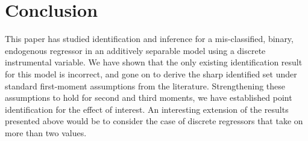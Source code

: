 \section{Conclusion}
\label{sec:conclusion}

This paper has studied identification and inference for a mis-classified, binary, endogenous regressor in an additively separable model using a discrete instrumental variable.
We have shown that the only existing identification result for this model is incorrect, and gone on to derive the sharp identified set under standard first-moment assumptions from the literature.
Strengthening these assumptions to hold for second and third moments, we have established point identification for the effect of interest.
An interesting extension of the results presented above would be to consider the case of discrete regressors that take on more than two values.
